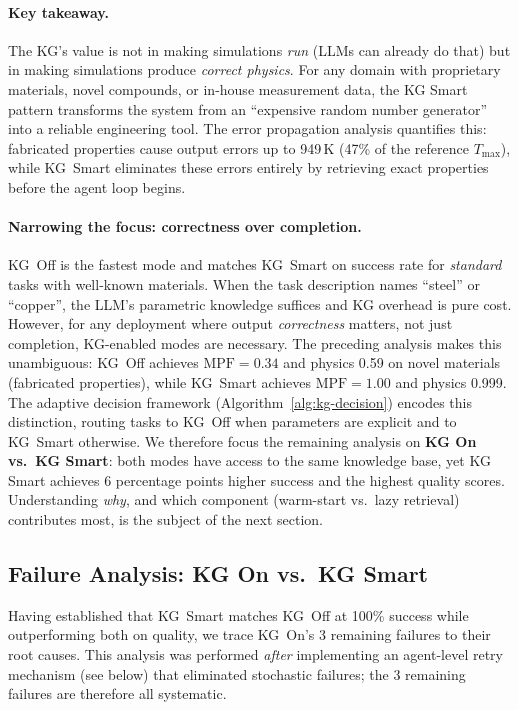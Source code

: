 \documentclass[preprint,review,12pt]{elsarticle}
\begin{document}
\paragraph{Key takeaway.}
The KG's value is not in making simulations \emph{run} (LLMs can
already do that) but in making simulations produce
\emph{correct physics}.  For any domain with proprietary materials,
novel compounds, or in-house measurement data, the KG Smart pattern
transforms the system from an ``expensive random number generator''
into a reliable engineering tool.  The error propagation analysis
quantifies this: fabricated properties cause output errors up to
949\,K (47\% of the reference $T_{\max}$), while KG~Smart eliminates
these errors entirely by retrieving exact properties before the agent
loop begins.

\paragraph{Narrowing the focus: correctness over completion.}
KG~Off is the fastest mode and matches KG~Smart on success rate for
\emph{standard} tasks with well-known materials.  When the task
description names ``steel'' or ``copper'', the LLM's parametric
knowledge suffices and KG overhead is pure cost.  However, for any
deployment where output \emph{correctness} matters, not just
completion, KG-enabled modes are necessary.  The preceding analysis
makes this unambiguous: KG~Off achieves $\text{MPF}{=}0.34$ and
physics 0.59 on novel materials (fabricated properties), while
KG~Smart achieves $\text{MPF}{=}1.00$ and physics 0.999.
The adaptive decision framework (Algorithm~\ref{alg:kg-decision})
encodes this distinction, routing tasks to KG~Off when
parameters are explicit and to KG~Smart otherwise.  We therefore focus
the remaining analysis on \textbf{KG On vs.\ KG Smart}: both modes
have access to the same knowledge base, yet KG Smart achieves 6
percentage points higher success and the highest quality scores.
Understanding \emph{why}, and which component (warm-start vs.\ lazy
retrieval) contributes most, is the subject of the next section.

\subsection{Failure Analysis: KG On vs.\ KG Smart}
\label{sec:failure-analysis}

Having established that KG~Smart matches KG~Off at 100\% success while
outperforming both on quality, we trace KG~On's 3 remaining failures
to their root causes.  This analysis was performed \emph{after}
implementing an agent-level retry mechanism (see below) that
eliminated stochastic failures; the 3 remaining failures are therefore
all systematic.
\end{document}
